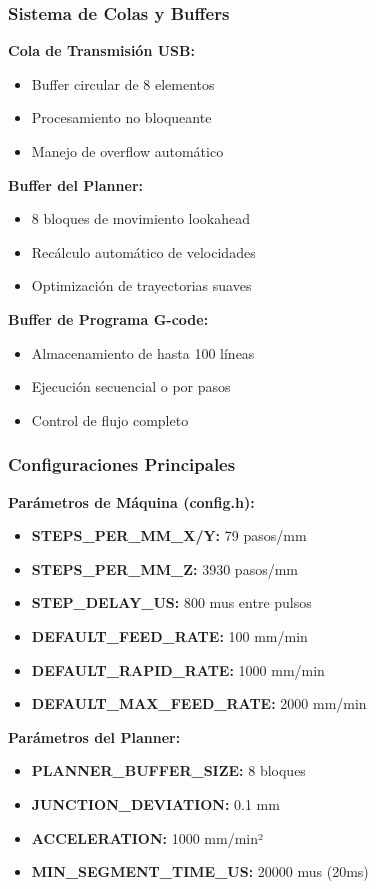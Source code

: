 \documentclass[12pt]{article}
\begin{document}
\subsubsection{Sistema de Colas y Buffers}

\textbf{Cola de Transmisión USB:}
\begin{itemize}
    \item Buffer circular de 8 elementos
    \item Procesamiento no bloqueante
    \item Manejo de overflow automático
\end{itemize}

\textbf{Buffer del Planner:}
\begin{itemize}
    \item 8 bloques de movimiento lookahead
    \item Recálculo automático de velocidades
    \item Optimización de trayectorias suaves
\end{itemize}

\textbf{Buffer de Programa G-code:}
\begin{itemize}
    \item Almacenamiento de hasta 100 líneas
    \item Ejecución secuencial o por pasos
    \item Control de flujo completo
\end{itemize}

\subsubsection{Configuraciones Principales}

\textbf{Parámetros de Máquina (config.h):}
\begin{itemize}
    \item \textbf{STEPS\_PER\_MM\_X/Y:} 79 pasos/mm
    \item \textbf{STEPS\_PER\_MM\_Z:} 3930 pasos/mm
    \item \textbf{STEP\_DELAY\_US:} 800 mus entre pulsos
    \item \textbf{DEFAULT\_FEED\_RATE:} 100 mm/min
    \item \textbf{DEFAULT\_RAPID\_RATE:} 1000 mm/min
    \item \textbf{DEFAULT\_MAX\_FEED\_RATE:} 2000 mm/min
\end{itemize}

\textbf{Parámetros del Planner:}
\begin{itemize}
    \item \textbf{PLANNER\_BUFFER\_SIZE:} 8 bloques
    \item \textbf{JUNCTION\_DEVIATION:} 0.1 mm
    \item \textbf{ACCELERATION:} 1000 mm/min²
    \item \textbf{MIN\_SEGMENT\_TIME\_US:} 20000 mus (20ms)
\end{itemize}
\end{document}
